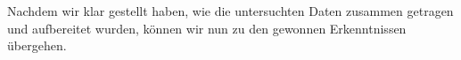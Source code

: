
Nachdem wir klar gestellt haben, wie die untersuchten Daten zusammen getragen und aufbereitet wurden, können wir nun zu den gewonnen Erkenntnissen übergehen.

